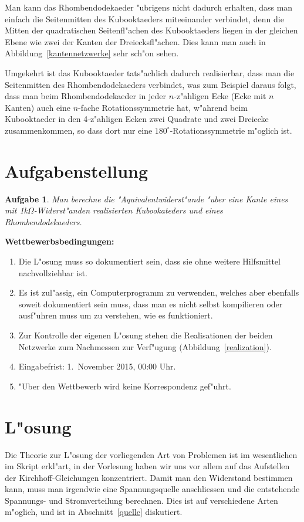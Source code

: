 \documentclass[a4paper,12pt]{article}
\begin{document}
Man kann das Rhombendodekaeder "ubrigens nicht dadurch erhalten, dass man
einfach die Seitenmitten des Kubooktaeders miteeinander verbindet, denn die
Mitten der quadratischen Seitenfl"achen des Kubooktaeders liegen in der
gleichen Ebene wie zwei der Kanten der Dreiecksfl"achen.
Dies kann man auch in Abbildung~\ref{kantennetzwerke} sehr sch"on sehen.

Umgekehrt ist das Kubooktaeder tats"achlich dadurch realisierbar, dass
man die Seitenmitten des Rhombendodekaeders verbindet, was zum Beispiel
daraus folgt, dass man beim Rhombendodekaeder in jeder $n$-z"ahligen
Ecke (Ecke mit $n$ Kanten) auch eine $n$-fache Rotationssymmetrie hat,
w"ahrend beim Kubooktaeder in den 4-z"ahligen Ecken zwei Quadrate
und zwei Dreiecke zusammenkommen, so dass dort nur eine
$180^\circ$-Rotationssymmetrie m"oglich ist.

\section{Aufgabenstellung}

\newtheorem{aufgabe}{Aufgabe}
\begin{aufgabe}
Man berechne die "Aquivalentwiderst"ande "uber eine Kante eines mit
1k$\Omega$-Widerst"anden realisierten Kubookateders und eines Rhombendodekaeders.
\end{aufgabe}

{\parindent0pt \bf Wettbewerbsbedingungen:}
\begin{enumerate}
\item
Die L"osung muss so dokumentiert sein, dass sie ohne weitere Hilfsmittel
nachvollziehbar ist.
\item
Es ist zul"assig, ein Computerprogramm zu verwenden, welches aber ebenfalls
soweit dokumentiert sein muss, dass man es nicht selbst kompilieren oder
ausf"uhren muss um zu verstehen, wie es funktioniert.
\item
Zur Kontrolle der eigenen L"osung stehen die Realisationen der beiden
Netzwerke zum Nachmessen zur Verf"ugung (Abbildung~\ref{realization}).
\item
Eingabefrist: 1.~November 2015, 00:00 Uhr.
\item
"Uber den Wettbewerb wird keine Korrespondenz gef"uhrt.
\end{enumerate}

\section{L"osung}
Die Theorie zur L"osung der vorliegenden Art von Problemen ist
im wesentlichen im Skript erkl"art, in der Vorlesung haben wir
uns vor allem auf das Aufstellen der Kirchhoff-Gleichungen 
konzentriert.
Damit man den Widerstand bestimmen kann, muss man irgendwie eine
Spannungsquelle anschliessen und die entstehende Spannungs- und Stromverteilung
berechnen.
Dies ist auf verschiedene Arten m"oglich, und ist in Abschnitt~\ref{quelle}
diskutiert.
\end{document}
